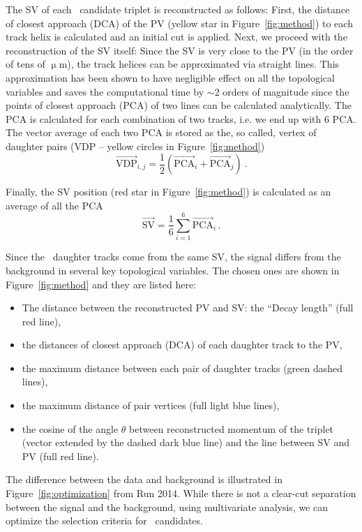 The SV of each \Lambdac\ candidate triplet is reconstructed as follows: First, the distance of closest approach (DCA) of the PV (yellow star in Figure~\ref{fig:method}) to each track helix is calculated and an initial cut is applied. Next, we proceed with the reconstruction of the SV itself\@: Since the SV is very close to the PV (in the order of tens of $\upmu$m), the track helices can be approximated via straight lines. This approximation has been shown to have negligible effect on all the topological variables and saves the computational time by $\sim$2 orders of magnitude since the points of closest approach (PCA) of two lines can be calculated analytically. The PCA is calculated for each combination of two tracks, i.e. we end up with 6 PCA. The vector average of each two PCA is stored as the, so called, vertex of daughter pairs (VDP -- yellow circles in Figure~\ref{fig:method})
\begin{equation}
\overrightarrow{\mathrm{VDP}}_{i,j} = \frac{1}{2} \left( \overrightarrow{\mathrm{PCA}}_i + \overrightarrow{\mathrm{PCA}}_j \right)\,. 
\end{equation}
 
Finally, the SV position (red star in Figure~\ref{fig:method}) is calculated as an average of all the PCA
\begin{equation}
\overrightarrow{\mathrm{SV}}=\frac{1}{6}\sum_{i=1}^6 \overrightarrow{\mathrm{PCA}}_i \,.
\end{equation}



Since the \Lambdac\ daughter tracks come from the same SV, the signal differs from the background in several key topological variables. The chosen ones are shown in Figure~\ref{fig:method} and they are listed here:
\begin{itemize}
 \item The distance between the reconstructed PV and SV: the ``Decay length'' (full red line),
 \item the distances of closest approach (DCA) of each daughter track to the PV,
 \item the maximum distance between each pair of daughter tracks (green dashed lines),
 \item the maximum distance of pair vertices (full light blue lines),
 \item the cosine of the angle $\theta$ between reconstructed momentum of the triplet (vector extended by the dashed dark blue line) and the line between SV and PV (full red line).
\end{itemize}
The difference between the data and background is illustrated in Figure~\ref{fig:optimization} from Run 2014\@. While there is not a clear-cut separation between the signal and the background, using multivariate analysis, we can optimize the selection criteria for \Lambdac\ candidates.

